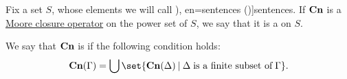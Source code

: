 \begin{definition}\label{def:consequence_operator}\mimprovised
  Fix a set \( S \), whose elements we will call \term[ru=предложения (\cite[103]{КолмогоровДрагалин2006Логика}), en=sentences (\cite[63]{Woodger1983TarskiPapers})]{sentences}. If \( \op*{Cn} \) is a \hyperref[def:moore_closure_operator]{Moore closure operator} on the power set of \( S \), we say that it is a  on \( S \).

  \begin{thmenum}
     We say that \( \op*{Cn} \) is  if the following condition holds:
    \begin{equation}\label{eq:def:consequence_operator/compactness}
      \op*{Cn}(\Gamma) = \bigcup\set{ \op*{Cn}(\Delta) \given \Delta \T{is a finite subset of} \Gamma }.
    \end{equation}
  \end{thmenum}
\end{definition}
